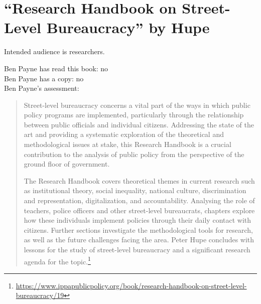 \section{``Research Handbook on Street-Level Bureaucracy'' by Hupe\label{review:hupe_handbook}}
\cite{2019_Hupe}


Intended audience is researchers.

Ben Payne has read this book: no\\
Ben Payne has a copy: no\\
Ben Payne's assessment:

\begin{quote}
Street-level bureaucracy concerns a vital part of the ways in which public policy programs are implemented, particularly through the relationship between public officials and individual citizens. Addressing the state of the art and providing a systematic exploration of the theoretical and methodological issues at stake, this Research Handbook is a crucial contribution to the analysis of public policy from the perspective of the ground floor of government. 

The Research Handbook covers theoretical themes in current research such as institutional theory, social inequality, national culture, discrimination and representation, digitalization, and accountability. Analysing the role of teachers, police officers and other street-level bureaucrats, chapters explore how these individuals implement policies through their daily contact with citizens. Further sections investigate the methodological tools for research, as well as the future challenges facing the area. Peter Hupe concludes with lessons for the study of street-level bureaucracy and a significant research agenda for the topic.\footnote{\href{https://www.ippapublicpolicy.org/book/research-handbook-on-street-level-bureaucracy/19}{https://www.ippapublicpolicy.org/book/research-handbook-on-street-level-bureaucracy/19}}
\end{quote}